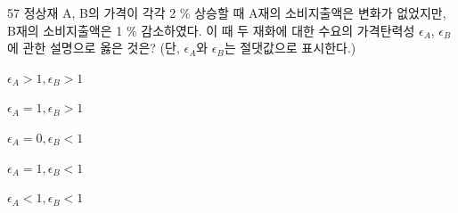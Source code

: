 \begin{question}{57}
정상재 A, B의 가격이 각각 2 \% 상승할 때 A재의 소비지출액은 변화가 없었지만, B재의 소비지출액은 1 \% 감소하였다. 이 때 두 재화에 대한 수요의 가격탄력성 ${ \epsilon_{ A } }$, ${ \epsilon_{ B } }$에 관한 설명으로 옳은 것은? (단, ${ \epsilon_{ A } }$와 ${ \epsilon_{ B } }$는 절댓값으로 표시한다.)
\begin{choices}
  \item $\epsilon_{ A } >1, \epsilon_{ B } >1$
  \item $\epsilon_{ A } =1, \epsilon_{ B } >1$
  \item $\epsilon_{ A } =0, \epsilon_{ B } <1$
  \item $\epsilon_{ A } =1, \epsilon_{ B } <1$
  \item $\epsilon_{ A } <1, \epsilon_{ B } <1$
\end{choices}
\end{question}
